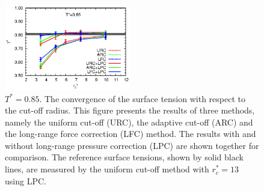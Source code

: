 \documentclass[aps,pre,preprint]{revtex4-1}
\begin{document}
\begin{figure}
  \centering
  \includegraphics[width=0.49\textwidth]{fig/converge.new/tension.t0.85.eps} 
  \caption{$T^\ast = 0.85$. The convergence of the surface tension
    with respect to the cut-off radius.  This figure presents the
    results of three methods, namely the uniform cut-off (URC), the
    adaptive cut-off (ARC) and the long-range force correction (LFC)
    method.  The results with and without long-range pressure
    correction (LPC) are shown together for comparison. The reference
    surface tensions, shown by solid black lines, are measured by the
    uniform cut-off method with $r_c^\ast=13$ using LPC.}
  \label{fig:tmp6}
\end{figure}
\end{document}

